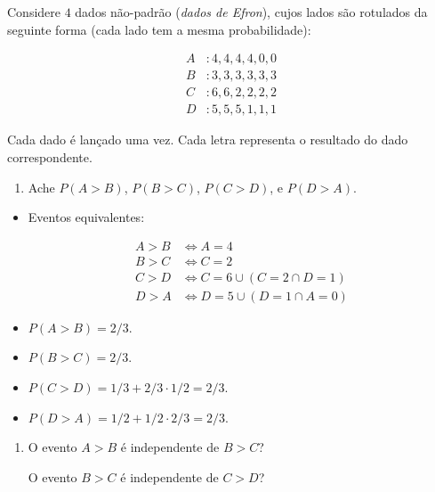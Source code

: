 \documentclass[
  11pt]{report}
\providecommand{\tightlist}{%
  \setlength{\itemsep}{0pt}\setlength{\parskip}{0pt}}
\begin{document}
\begin{rmdbox}

Considere $4$ dados não-padrão (\emph{dados de Efron}), cujos lados são rotulados da seguinte forma (cada lado tem a mesma probabilidade):

\[
\begin{aligned}
  A &: 4, 4, 4, 4, 0, 0 \\
  B &: 3, 3, 3, 3, 3, 3 \\
  C &: 6, 6, 2, 2, 2, 2 \\
  D &: 5, 5, 5, 1, 1, 1
\end{aligned}
\]

Cada dado é lançado uma vez. Cada letra representa o resultado do dado correspondente.

\begin{enumerate}
\def\labelenumi{\alph{enumi}.}
\tightlist
\item
  Ache $P(A > B)$, $P(B > C)$, $P(C > D)$, e $P(D > A)$.
\end{enumerate}

\end{rmdbox}

\begin{itemize}
\item
  Eventos equivalentes:

  \[
  \begin{aligned}
    A > B &\iff A = 4 \\
    B > C &\iff C = 2 \\
    C > D &\iff C = 6 \cup (C = 2 \cap D = 1) \\
    D > A & \iff D = 5 \cup (D = 1\cap A = 0)
  \end{aligned}
  \]
\item
  $P(A > B) = 2/3$.
\item
  $P(B > C) = 2/3$.
\item
  $P(C > D) = 1/3 + 2/3 \cdot 1/2 = 2/3$.
\item
  $P(D > A) = 1/2 + 1/2 \cdot 2/3 = 2/3$.
\end{itemize}

\begin{rmdbox}

\begin{enumerate}
\def\labelenumi{\alph{enumi}.}
\setcounter{enumi}{1}
\item
  O evento $A > B$ é independente de $B > C$?

  O evento $B > C$ é independente de $C > D$?
\end{enumerate}

\end{rmdbox}
\end{document}
